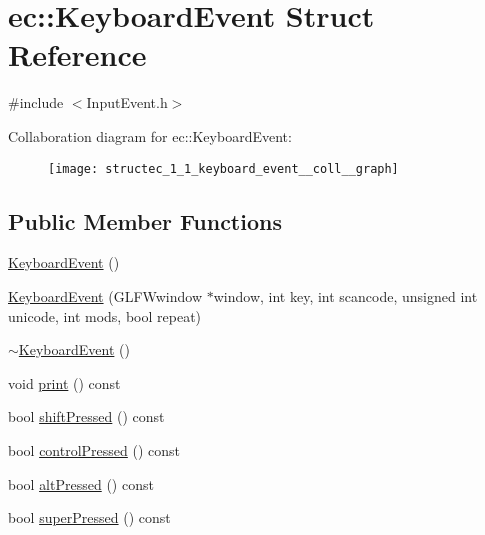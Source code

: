 \hypertarget{structec_1_1_keyboard_event}{}\section{ec\+:\+:Keyboard\+Event Struct Reference}
\label{structec_1_1_keyboard_event}


{\ttfamily \#include $<$Input\+Event.\+h$>$}



Collaboration diagram for ec\+:\+:Keyboard\+Event\+:\nopagebreak
\begin{figure}[H]
\begin{center}
\leavevmode
\texttt{[image: structec\_1\_1\_keyboard\_event\_\_coll\_\_graph]}
\end{center}
\end{figure}
\subsection*{Public Member Functions}
\begin{DoxyCompactItemize}
\item 
\mbox{\hyperlink{structec_1_1_keyboard_event_a7bec67ef8aff46a11e0472a73e9b6916}{Keyboard\+Event}} ()
\item 
\mbox{\hyperlink{structec_1_1_keyboard_event_a2914ab97f4705f779d630a4c1dbcf4b6}{Keyboard\+Event}} (G\+L\+F\+Wwindow $\ast$window, int key, int scancode, unsigned int unicode, int mods, bool repeat)
\item 
\mbox{\hyperlink{structec_1_1_keyboard_event_a7631a5a8d33373e6b6d739235815dee4}{$\sim$\+Keyboard\+Event}} ()
\item 
void \mbox{\hyperlink{structec_1_1_keyboard_event_a6532e5ce11d3459e28b9e6e0c0ee5d0d}{print}} () const
\item 
bool \mbox{\hyperlink{structec_1_1_keyboard_event_af4ba450f1dadb9b4b28de024c96efbf3}{shift\+Pressed}} () const
\item 
bool \mbox{\hyperlink{structec_1_1_keyboard_event_a3da5135d568d0e15e1f6b3ddd3e3a28d}{control\+Pressed}} () const
\item 
bool \mbox{\hyperlink{structec_1_1_keyboard_event_afa24be439032cd053aca60cba17b4b32}{alt\+Pressed}} () const
\item 
bool \mbox{\hyperlink{structec_1_1_keyboard_event_a86f635631ed297562f5e5c0c0a750f1d}{super\+Pressed}} () const
\end{DoxyCompactItemize}
